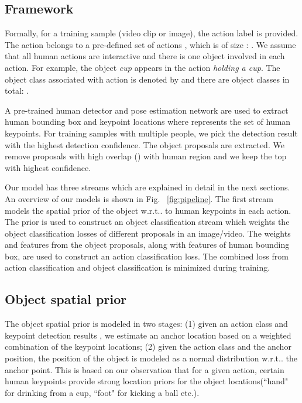 \documentclass[10pt,twocolumn,letterpaper]{article}
\makeatletter
\DeclareRobustCommand\onedot{\futurelet\@let@token\@onedot}
\def\onedot{\ifx\@let@token.\else.\null\fi\xspace}
\def\wrt{w.r.t\onedot}
\makeatother
\begin{document}
\vspace{-0.4\baselineskip}
\subsection{Framework}
\vspace{-0.5\baselineskip}

Formally, for a training sample (video clip or image), the action label  is provided. The action  belongs to a pre-defined set of actions , which is of size : . We assume that all human actions are interactive and there is one object involved in each action. For example, the object \textit{cup} appears in the action \textit{holding a cup}.
The object class associated with action  is denoted by  and there are  object classes in total: .


A pre-trained human detector \cite{he2017mask} and pose estimation network \cite{wei2016convolutional} are used to extract human bounding box  and keypoint locations  where  represents the set of human keypoints. For training samples with multiple people, we pick the detection result with the highest detection confidence. The object proposals  are extracted. We remove proposals with high overlap () with human region  and we keep the top  with highest confidence.

Our model has three streams which are explained in detail in the next sections. An overview of our models is shown in Fig.~
\ref{fig:pipeline}. The first stream models the spatial prior of the object \wrt to human keypoints in each action. The prior is used to construct an object classification stream which weights the object classification losses of different proposals in an image/video. The weights and features from the object proposals, along with features of human bounding box, are used to construct an action classification loss. The combined loss from action classification and object classification is minimized during training.











\vspace{-0.3\baselineskip}
\subsection{Object spatial prior}
\vspace{-0.3\baselineskip}
The object spatial prior is modeled in two stages: (1) given an action class  and keypoint detection results , we estimate an anchor location based on a weighted combination of the keypoint locations; (2) given the action class and the anchor position, the position of the object is modeled as a normal distribution \wrt the anchor point. This is based on our observation that for a given action, certain human keypoints provide strong location priors for the object locations(``hand" for drinking from a cup, ``foot" for kicking a ball etc.).
\end{document}
